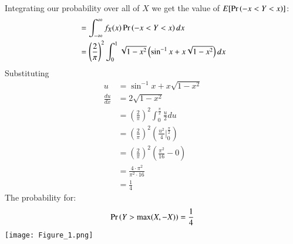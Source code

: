 \documentclass[journal,12pt,twocolumn]{IEEEtran}
\begin{document}
Integrating our probability over all of $X$ we get the value of $ E[\Pr\left(-x<Y<x\right)]$:
\begin{align}
&=\int_{-\infty}^{\infty}f_X(x)\Pr\left(-x<Y<x\right)dx\\
    &=\left(\frac{2}{\pi}\right)^2\int_0^1\sqrt{1-x^2}\left(\sin^{-1}{x} + x\sqrt{1-x^2}\right)dx
\end{align}
Substituting
\begin{align} 
u &= \sin^{-1}{x} + x\sqrt{1-x^2}\\
\frac{du}{dx} &= 2\sqrt{1-x^2}\\
&=\left(\frac{2}{\pi}\right)^2\int_0^{\frac{\pi}{2}}\frac{u}{2}du\\
&=\left(\frac{2}{\pi}\right)^2\left(\frac{u^2}{4} \bigg |_0^{\frac{\pi}{2}}\right)\\
&=\left(\frac{2}{\pi}\right)^2\left(\frac{\pi^2}{16} - 0\right)\\
    &=\frac{4\cdot{\pi}^2}{{\pi}^2\cdot16}\\
    &=\frac{1}{4}
\end{align}
The probability for:
\begin{align}
    \Pr\left(Y>\text{max}(X,-X)\right) = \frac{1}{4}
\end{align}
\texttt{[image: Figure\_1.png]}
\end{document}
